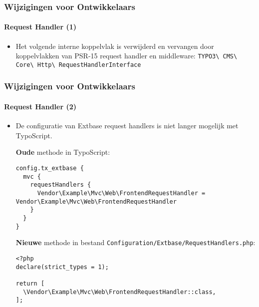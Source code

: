 
\begin{frame}[fragile]
	\frametitle{Wijzigingen voor Ontwikkelaars}
	\framesubtitle{Request Handler (1)}

	\begin{itemize}
		\item Het volgende interne koppelvlak is verwijderd en vervangen door
			koppelvlakken van PSR-15 request handler en middleware:\newline
			\texttt{TYPO3\textbackslash
				CMS\textbackslash
				Core\textbackslash
				Http\textbackslash
				RequestHandlerInterface}

	\end{itemize}

\end{frame}


\begin{frame}[fragile]
	\frametitle{Wijzigingen voor Ontwikkelaars}
	\framesubtitle{Request Handler (2)}

	\lstset{basicstyle=\tiny\ttfamily}

	\begin{itemize}
		\item De configuratie van Extbase request handlers is niet langer mogelijk met TypoScript.

		\smaller\textbf{Oude} methode in TypoScript:\normalsize
\begin{lstlisting}
config.tx_extbase {
  mvc {
    requestHandlers {
      Vendor\Example\Mvc\Web\FrontendRequestHandler = Vendor\Example\Mvc\Web\FrontendRequestHandler
    }
  }
}
\end{lstlisting}

		\smaller\textbf{Nieuwe} methode in bestand \texttt{Configuration/Extbase/RequestHandlers.php}:\normalsize
\begin{lstlisting}
<?php
declare(strict_types = 1);

return [
  \Vendor\Example\Mvc\Web\FrontendRequestHandler::class,
];
\end{lstlisting}

	\end{itemize}

\end{frame}


